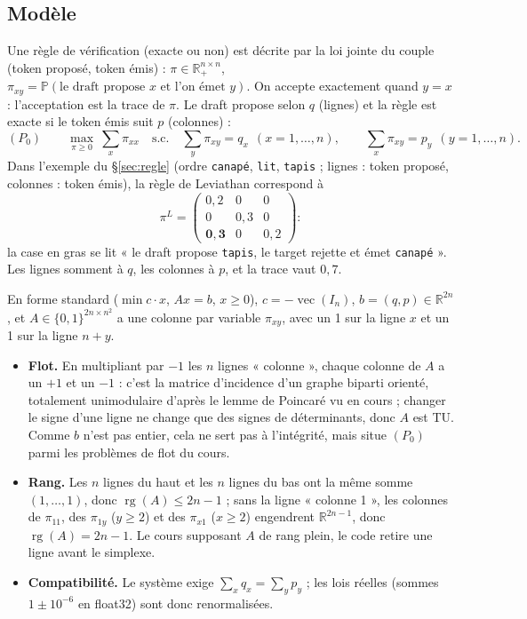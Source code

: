 \documentclass[11pt,a4paper]{article}
\newcommand{\R}{\mathbb{R}}
\newcommand{\Prob}{\mathbb{P}}
\newcommand{\vecop}{\operatorname{vec}}
\newcommand{\rg}{\operatorname{rg}}
\newcommand{\tok}[1]{\texttt{#1}}
\theoremstyle{plain}
\begin{document}
\subsection{Modèle}\label{sec:modeleI}
Une règle de vérification (exacte ou non) est décrite par la loi jointe du couple (token proposé, token émis) : $\pi\in\R_+^{n\times n}$, $\pi_{xy}=\Prob(\text{le draft propose }x\text{ et l'on émet }y)$. On accepte exactement quand $y=x$ : l'acceptation est la trace de $\pi$. Le draft propose selon $q$ (lignes) et la règle est exacte si le token émis suit $p$ (colonnes) :
\[(P_0)\qquad \max_{\pi\ge0}\ \sum_x\pi_{xx}\quad\text{s.c.}\quad \sum_y\pi_{xy}=q_x\ \ (x=1,\dots,n),\qquad \sum_x\pi_{xy}=p_y\ \ (y=1,\dots,n).\]
Dans l'exemple du §\ref{sec:regle} (ordre \tok{canapé}, \tok{lit}, \tok{tapis} ; lignes : token proposé, colonnes : token émis), la règle de Leviathan correspond à
\[\pi^L=\begin{pmatrix}0{,}2&0&0\\0&0{,}3&0\\\mathbf{0{,}3}&0&0{,}2\end{pmatrix} :\]
la case en gras se lit « le draft propose \tok{tapis}, le target rejette et émet \tok{canapé} ». Les lignes somment à $q$, les colonnes à $p$, et la trace vaut $0{,}7$.

En forme standard ($\min c\cdot x$, $Ax=b$, $x\ge0$), $c=-\vecop(I_n)$, $b=(q,p)\in\R^{2n}$, et $A\in\{0,1\}^{2n\times n^2}$ a une colonne par variable $\pi_{xy}$, avec un 1 sur la ligne $x$ et un 1 sur la ligne $n+y$.
\begin{itemize}
\item \textbf{Flot.} En multipliant par $-1$ les $n$ lignes « colonne », chaque colonne de $A$ a un $+1$ et un $-1$ : c'est la matrice d'incidence d'un graphe biparti orienté, totalement unimodulaire d'après le lemme de Poincaré vu en cours ; changer le signe d'une ligne ne change que des signes de déterminants, donc $A$ est TU. Comme $b$ n'est pas entier, cela ne sert pas à l'intégrité, mais situe $(P_0)$ parmi les problèmes de flot du cours.
\item \textbf{Rang.} Les $n$ lignes du haut et les $n$ lignes du bas ont la même somme $(1,\dots,1)$, donc $\rg(A)\le2n-1$ ; sans la ligne « colonne 1 », les colonnes de $\pi_{11}$, des $\pi_{1y}$ ($y\ge2$) et des $\pi_{x1}$ ($x\ge2$) engendrent $\R^{2n-1}$, donc $\rg(A)=2n-1$. Le cours supposant $A$ de rang plein, le code retire une ligne avant le simplexe.
\item \textbf{Compatibilité.} Le système exige $\sum_xq_x=\sum_yp_y$ ; les lois réelles (sommes $1\pm10^{-6}$ en float32) sont donc renormalisées.
\end{itemize}
\end{document}
